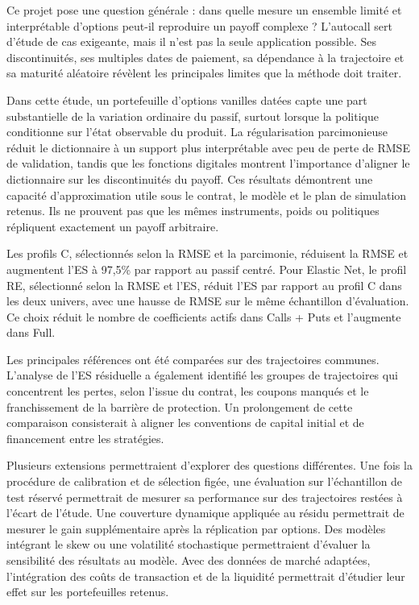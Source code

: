 \documentclass[12pt,a4paper]{article}
\newcommand{\1}{\mathbf{1}}
\begin{document}
Ce projet pose une question générale : dans quelle mesure un ensemble limité et interprétable d'options peut-il reproduire un payoff complexe ? L'autocall sert d'étude de cas exigeante, mais il n'est pas la seule application possible. Ses discontinuités, ses multiples dates de paiement, sa dépendance à la trajectoire et sa maturité aléatoire révèlent les principales limites que la méthode doit traiter.

Dans cette étude, un portefeuille d'options vanilles datées capte une part substantielle de la variation ordinaire du passif, surtout lorsque la politique conditionne sur l'état observable du produit. La régularisation parcimonieuse réduit le dictionnaire à un support plus interprétable avec peu de perte de RMSE de validation, tandis que les fonctions digitales montrent l'importance d'aligner le dictionnaire sur les discontinuités du payoff. Ces résultats démontrent une capacité d'approximation utile sous le contrat, le modèle et le plan de simulation retenus. Ils ne prouvent pas que les mêmes instruments, poids ou politiques répliquent exactement un payoff arbitraire.

Les profils C, sélectionnés selon la RMSE et la parcimonie, réduisent la RMSE et augmentent l’ES à 97,5\% par rapport au passif centré. Pour Elastic Net, le profil RE, sélectionné selon la RMSE et l’ES, réduit l’ES par rapport au profil C dans les deux univers, avec une hausse de RMSE sur le même échantillon d’évaluation. Ce choix réduit le nombre de coefficients actifs dans Calls + Puts et l’augmente dans Full.

Les principales références ont été comparées sur des trajectoires communes. L’analyse de l’ES résiduelle a également identifié les groupes de trajectoires qui concentrent les pertes, selon l’issue du contrat, les coupons manqués et le franchissement de la barrière de protection. Un prolongement de cette comparaison consisterait à aligner les conventions de capital initial et de financement entre les stratégies.

Plusieurs extensions permettraient d’explorer des questions différentes. Une fois la procédure de calibration et de sélection figée, une évaluation sur l’échantillon de test réservé permettrait de mesurer sa performance sur des trajectoires restées à l’écart de l’étude. Une couverture dynamique appliquée au résidu permettrait de mesurer le gain supplémentaire après la réplication par options. Des modèles intégrant le skew ou une volatilité stochastique permettraient d’évaluer la sensibilité des résultats au modèle. Avec des données de marché adaptées, l’intégration des coûts de transaction et de la liquidité permettrait d’étudier leur effet sur les portefeuilles retenus.
\end{document}
